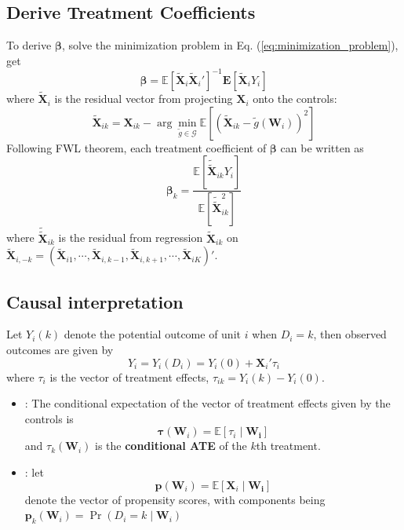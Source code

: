 \documentclass[twoside]{article}
\begin{document}
\subsection{Derive Treatment Coefficients} 
To derive $\mathbf{\beta}$, solve the minimization problem in Eq. (\ref{eq:minimization_problem}), get
\begin{equation}\label{eq:beta_vector_derived}
    \boldsymbol{\beta} = \mathbb{E}\left[ \tilde{\mathbf{X}}_i \tilde{\mathbf{X}}_i' \right]^{-1}\mathbf{E}[\tilde{\mathbf{X}}_i Y_i]
\end{equation}
where $\tilde{\mathbf{X}}_i$ is the residual vector from projecting $\mathbf{X}_i$ onto the controls:
$$
\tilde{\mathbf{X}}_{ik} = \mathbf{X}_{ik} - \arg\min_{\tilde{g}\in\mathcal{G}}\mathbb{E}\left[\left(\tilde{\mathbf{X}}_{ik}-\tilde{g}\left({\mathbf{W}}_i\right)\right)^2\right]
$$
Following FWL theorem, each treatment coefficient of $\boldsymbol{\beta}$ can be written as 
$$
\boldsymbol{\beta}_k = \frac{\mathbb{E}\left[\tilde{\tilde{\mathbf{X}}}_{ik}Y_i\right]}{\mathbb{E}\left[\tilde{\tilde{\mathbf{X}}}^2_{ik}\right]}
$$
where $\tilde{\tilde{\mathbf{X}}}_{ik}$ is the residual from regression $\tilde{\mathbf{X}}_{ik}$ on $\tilde{\mathbf{X}}_{i,-k} = \left(\tilde{\mathbf{X}}_{i1},\cdots, \tilde{\mathbf{X}}_{i,k-1},\tilde{\mathbf{X}}_{i,k+1},\cdots,\tilde{\mathbf{X}}_{iK}\right)'$.

\subsection{Causal interpretation}
Let $Y_i(k)$ denote the potential outcome of unit $i$ when $D_i=k$, then observed outcomes are given by 
$$
Y_i = Y_i(D_i) = Y_i(0) + \mathbf{X}_i'\tau_i
$$
where $\tau_i$ is the vector of treatment effects, $\tau_{ik} = Y_i(k)-Y_i(0)$. 
\begin{itemize}
    \item {}: The conditional expectation of the vector of treatment effects given by the controls is 
    $$
    \boldsymbol{\tau}(\mathbf{W}_i) = \mathbb{E}\left[\tau_i\mid \mathbf{W_i}\right]
    $$
    and $\tau_k(\mathbf{W}_i)$ is the {\textbf{conditional ATE}} of the $k$th treatment.
    \item {}: let $$\mathbf{p}(\mathbf{W}_i) = \mathbb{E}\left[ \mathbf{X}_i\mid\mathbf{W_i} \right]$$ denote the vector of propensity scores, with components being $\mathbf{p}_k(\mathbf{W}_i) = \Pr \left(D_i=k\mid \mathbf{W}_i\right)$
\end{itemize}
\end{document}
